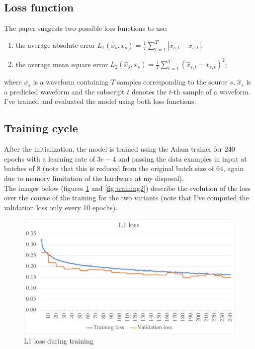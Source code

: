 \documentclass[12pt]{article}
\begin{document}
\subsection{Loss function}
The paper suggests two possible loss functions to use:
\begin{enumerate}
\item the average absolute error \(L_{1}\left(\hat{x}_{s}, x_{s}\right)=\frac{1}{T} \sum_{t=1}^{T}\left|\hat{x}_{s, t}-x_{s, t}\right|\);
\item the average mean square error \(L_{2}\left(\hat{x}_{s}, x_{s}\right)=\frac{1}{T} \sum_{t=1}^{T}\left(\hat{x}_{s, t}-x_{s, t}\right)^{2}\);
\end{enumerate}
where \(x_{s}\) is a waveform containing \(T\) samples corresponding to the source \(s\), \(\hat{x}_{s}\) is a predicted waveform and the subscript \(t\) denotes the \(t\)-th sample of a waveform.\\
I've trained and evaluated the model using both loss functions.

\subsection{Training cycle}
After the initialization, the model is trained using the Adam trainer for 240 epochs with a learning rate of \(3e-4\) and passing the data examples in input at batches of 8 (note that this is reduced from the original batch size of 64, again due to memory limitation of the hardware at my disposal).\\
The images below (figures \ref{fig:training1} and \ref{fig:training2}) describe the evolution of the loss over the course of the training for the two variants (note that I've computed the validation loss only every 10 epochs).


\newpage

\begin{figure}[h]
  \centering
  \includegraphics[width=1\linewidth]{l1}
  \caption{L1 loss during training}
  \label{fig:training1}
\end{figure}
\end{document}
